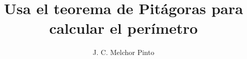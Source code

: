 \documentclass[12pt]{guia}
\title{Usa el teorema de Pitágoras para calcular el perímetro}
\author{J. C. Melchor Pinto}
\begin{document}
\pagestyle{headandfoot}
\addpoints
\INFO
\printanswers

\newpage
\begin{questions}
    \questionboxed[10] 
    \questionboxed[10] 
    \questionboxed[10] 
    \questionboxed[10] 
    \questionboxed[10] 
    \questionboxed[10] 
    \questionboxed[10] 
    \questionboxed[10] 
\end{questions}
\end{document}
